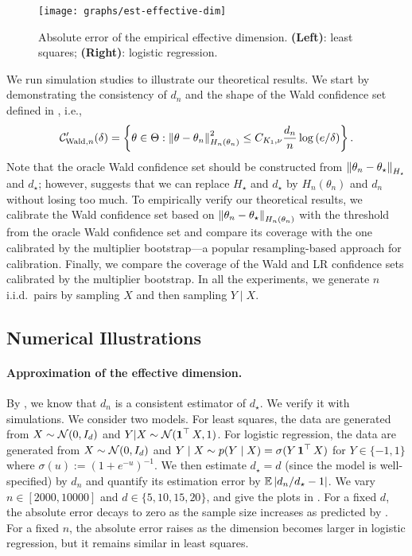 \begin{figure}
  \centering
  \texttt{[image: graphs/est-effective-dim]}
  \caption{Absolute error of the empirical effective dimension. \textbf{(Left)}: least squares; \textbf{(Right)}: logistic regression.}
  \label{fig:est_effective_dim}
\end{figure}

We run simulation studies to illustrate our theoretical results.
We start by demonstrating the consistency of $d_n$ and the shape of the Wald confidence set defined in , i.e.,
\begin{align*}
  \mathcal{C}_{\text{Wald}, n}'(\delta) = \left\{\theta \in \Theta: \left\lVert \theta - \theta_n \right\rVert_{H_n(\theta_n)}^2 \le C_{K_1,\nu} \frac{d_n}{n} \log{(e/\delta)} \right\}.
\end{align*}
Note that the oracle Wald confidence set should be constructed from $\left\lVert \theta_n - \theta_\star \right\rVert_{H_\star}$ and $d_\star$; however,  suggests that we can replace $H_\star$ and $d_\star$ by $H_n(\theta_n)$ and $d_n$ without losing too much.
To empirically verify our theoretical results, we calibrate the Wald confidence set based on $\left\lVert \theta_n - \theta_\star \right\rVert_{H_n(\theta_n)}$ with the threshold from the oracle Wald confidence set and compare its coverage with the one calibrated by the multiplier bootstrap---a popular resampling-based approach for calibration.
Finally, we compare the coverage of the Wald and LR confidence sets calibrated by the multiplier bootstrap.
In all the experiments, we generate $n$ i.i.d.~pairs by sampling $X$ and then sampling $Y \mid X$.

\subsection{Numerical Illustrations}

\paragraph{Approximation of the effective dimension.}
By , we know that $d_n$ is a consistent estimator of $d_\star$.
We verify it with simulations.
We consider two models.
For least squares, the data are generated from $X \sim \mathcal{N}(0, I_d)$ and $Y | X \sim \mathcal{N}(\operatorname{\mathbf 1}^\top X, 1)$.
For logistic regression, the data are generated from $X \sim \mathcal{N}(0, I_d)$ and $Y \mid X \sim p(Y \mid X) = \sigma(Y \operatorname{\mathbf 1}^\top X)$ for $Y \in \{-1, 1\}$ where $\sigma(u) := (1 + e^{-u})^{-1}$.
We then estimate $d_\star = d$ (since the model is well-specified) by $d_n$ and quantify its estimation error by $\operatorname{\mathbb E}\left| d_n / d_\star - 1 \right|$.
We vary $n \in [2000, 10000]$ and $d \in \{5, 10, 15, 20\}$, and give the plots in .
For a fixed $d$, the absolute error decays to zero as the sample size increases as predicted by .
For a fixed $n$, the absolute error raises as the dimension becomes larger in logistic regression, but it remains similar in least squares.

